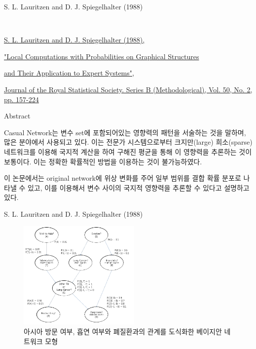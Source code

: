 \documentclass{beamer}
\begin{document}
\begin{frame}{S. L. Lauritzen and D. J. Spiegelhalter (1988)}

{}\

{\scriptsize{}{\underline{S. L. Lauritzen and D. J. Spiegelhalter (1988),}}
}

{\scriptsize{}{\underline{"Local Computations with Probabilities on Graphical Structures}}}

\begin{flushright}
{\scriptsize{}{\underline{and Their Application to Expert Systems",}}}
\end{flushright}

{\scriptsize{}{\underline{Journal of the Royal Statistical Society. Series B (Methodological), Vol. 50, No. 2, pp. 157-224}}}

{\scriptsize{}
\begin{center}
Abstract
\end{center}
Casual Network는 변수 set에 포함되어있는 영향력의 패턴을 서술하는 것을 말하며, 많은 분야에서 사용되고 있다. 이는 전문가 시스템으로부터 크지만(large) 희소(sparse) 네트워크를 이용해 국지적 계산을 하여 구해진 평균을 통해 이 영향력을 추론하는 것이 보통이다. 이는 정확한 확률적인 방법을 이용하는 것이 불가능하였다.

이 논문에서는 original network에 위상 변화를 주어 일부 범위를 결합 확률 분포로 나타낼 수 있고, 이를 이용해서 변수 사이의 국지적 영향력을 추론할 수 있다고 설명하고 있다.
}
\end{frame}



\begin{frame}{S. L. Lauritzen and D. J. Spiegelhalter (1988)}

	\begin{figure}
		\includegraphics[height=150pt]{images/image82}
		\caption{\tiny{아시아 방문 여부, 흡연 여부와 폐질환과의 관계를 도식화한 베이지안 네트워크 모형}}
	\end{figure}

\end{frame}
\end{document}
